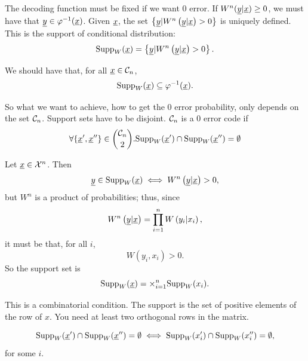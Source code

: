 The decoding function must be fixed if we want $0$ error.
If $W^n(\underline{y} | \underline{x}) \ge 0$, we must have that $\underline{y} \in \varphi^{-1}(\underline{x})$.
Given $\underline{x}$, the set $\left\{ \underline{y} | W^n \left( \underline{y} | \underline{x} \right) > 0 \right\}$ is uniquely defined.
This is the support of conditional distribution:
\begin{equation*}
	\mathrm{Supp}_W(\underline{x}) = \left\{ \underline{y} |  W^n \left( \underline{y} | \underline{x} \right) > 0 \right\}.
\end{equation*}

We should have that, for all $\underline{x} \in \mathcal{C}_n$,
\begin{equation*}
	\mathrm{Supp}_W(\underline{x}) \subseteq \varphi^{-1}(\underline{x}).
\end{equation*}

So what we want to achieve, \ie how to get the 0 error probability, only depends on the set $\mathcal{C}_n$.
Support sets have to be disjoint.
$\mathcal{C}_n$ is a $0$ error code if
\begin{equation*}
	\forall \{ \underline{x}',\underline{x}'' \} \in \binom{\mathcal{C}_n}{2} .
	\mathrm{Supp}_W(\underline{x}') \cap \mathrm{Supp}_W(\underline{x}'') = \emptyset
\end{equation*}

\begin{obs}
	Let $\underline{x} \in \mathcal{X}^n$.
	Then
	\begin{equation*}
		\underline{y} \in \mathrm{Supp}_W(\underline{x}) \iff W^n \left( \underline{y} | \underline{x} \right) >0,
	\end{equation*}
	but $W^n$ is a product of probabilities; thus, since
	\begin{equation*}
		W^n \left( \underline{y} | \underline{x} \right) = \prod_{i=1}^{n} W \left( y_i | x_i \right),
	\end{equation*}
	it must be that, for all $i$,
	\begin{equation*}
		W(y_i, x_i) > 0.
	\end{equation*}
	So the support set is
	\begin{equation*}
		\mathrm{Supp}_W(\underline{x}) = \times_{i=1}^{n} \mathrm{Supp}_W(x_i).
	\end{equation*}
\end{obs}

This is a combinatorial condition.
The support is the set of positive elements of the row of $x$.
You need at least two orthogonal rows in the matrix.

\begin{obs}
	\begin{equation*}
		\mathrm{Supp}_W(\underline{x}') \cap \mathrm{Supp}_W(\underline{x}'') = \emptyset
		\iff
		\mathrm{Supp}_W(x_i') \cap \mathrm{Supp}_W(x_i'') = \emptyset,
	\end{equation*}
	for some $i$. 
\end{obs}

